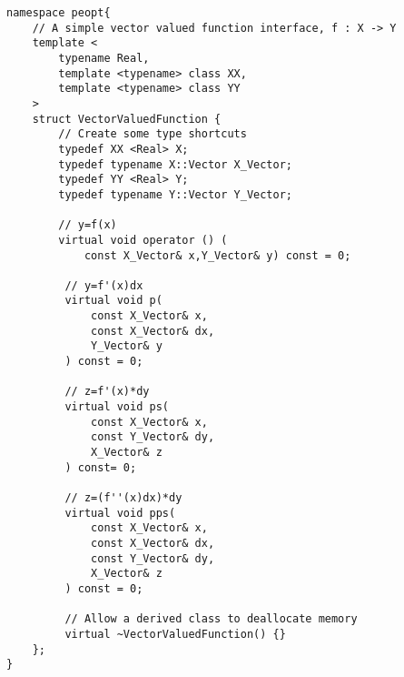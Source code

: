 \begin{lstlisting}[style=C++]
namespace peopt{
    // A simple vector valued function interface, f : X -> Y
    template <
        typename Real,
        template <typename> class XX,
        template <typename> class YY
    >
    struct VectorValuedFunction {
        // Create some type shortcuts
        typedef XX <Real> X;
        typedef typename X::Vector X_Vector;
        typedef YY <Real> Y;
        typedef typename Y::Vector Y_Vector;

        // y=f(x)
        virtual void operator () (
            const X_Vector& x,Y_Vector& y) const = 0;

         // y=f'(x)dx 
         virtual void p(
             const X_Vector& x,
             const X_Vector& dx,
             Y_Vector& y
         ) const = 0;

         // z=f'(x)*dy
         virtual void ps(
             const X_Vector& x,
             const Y_Vector& dy,
             X_Vector& z
         ) const= 0;

         // z=(f''(x)dx)*dy
         virtual void pps(
             const X_Vector& x,
             const X_Vector& dx,
             const Y_Vector& dy,
             X_Vector& z
         ) const = 0;

         // Allow a derived class to deallocate memory
         virtual ~VectorValuedFunction() {}
    };
}
\end{lstlisting}
